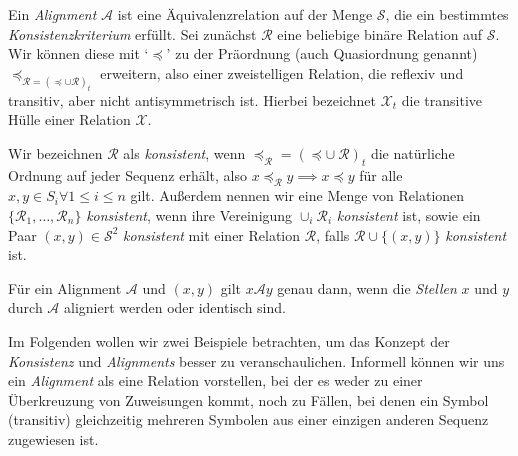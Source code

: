 \begin{definition}
	Ein \emph{Alignment} $\mathcal{A}$ ist eine Äquivalenzrelation auf der Menge $\mathcal{S}$, die ein bestimmtes \emph{Konsistenzkriterium} erfüllt. Sei zunächst $\mathcal{R}$ eine beliebige binäre Relation auf $\mathcal{S}$. Wir können diese mit `$\preceq$' zu der Präordnung (auch Quasiordnung genannt) $\preceq_{\mathcal{R}=(\preceq \cup \mathcal{R})_t}$ erweitern, also einer zweistelligen Relation, die reflexiv und transitiv, aber nicht antisymmetrisch ist. Hierbei bezeichnet $\mathcal{X}_t$ die transitive Hülle einer Relation $\mathcal{X}$. 
	
	Wir bezeichnen $\mathcal{R}$ als \emph{konsistent}, wenn $\preceq_{\mathcal{R}}=(\preceq \cup\: \mathcal{R})_t$ die natürliche Ordnung auf jeder Sequenz erhält, also $x \preceq_{\mathcal{R}} y \implies x \preceq y$ für alle $x,y \in S_i \forall 1\leq i \leq n$ gilt. Außerdem nennen wir eine Menge von Relationen $\{\mathcal{R}_1, \dots, \mathcal{R}_n\}$ \emph{konsistent}, wenn ihre Vereinigung $\cup_i \mathcal{R}_i$ \emph{konsistent} ist, sowie ein Paar $(x,y) \in \mathcal{S}^2$ \emph{konsistent} mit einer Relation $\mathcal{R}$, falls $\mathcal{R} \cup \{(x,y)\}$ \emph{konsistent} ist.
	
	Für ein Alignment $\mathcal{A}$ und $(x,y)$ gilt $x\mathcal{A}y$ genau dann, wenn die \emph{Stellen} $x$ und $y$ durch $\mathcal{A}$ aligniert werden oder identisch sind.
\end{definition}

Im Folgenden wollen wir zwei Beispiele betrachten, um das Konzept der \emph{Konsistenz} und \emph{Alignments} besser zu veranschaulichen. Informell können wir uns ein \emph{Alignment} als eine Relation vorstellen, bei der es weder zu einer Überkreuzung von Zuweisungen kommt, noch zu Fällen, bei denen ein Symbol (transitiv) gleichzeitig mehreren Symbolen aus einer einzigen anderen Sequenz zugewiesen ist.

